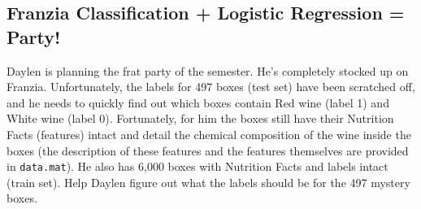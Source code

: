 \newpage


\subsection{Franzia Classification + Logistic Regression = Party!}

  Daylen is planning the frat party of the semester. He's completely stocked up
  on Franzia. Unfortunately, the labels for 497 boxes (test set) have been
  scratched off, and he needs to quickly find out which boxes contain Red wine
  (label 1) and White wine (label 0). Fortunately, for him the boxes still have
  their Nutrition Facts (features) intact and detail the chemical composition
  of the wine inside the boxes (the description of these features and the
  features themselves are provided in {\tt data.mat}). He also has 6,000 boxes
  with Nutrition Facts and labels intact (train set). Help Daylen figure out
  what the labels should be for the 497 mystery boxes.

